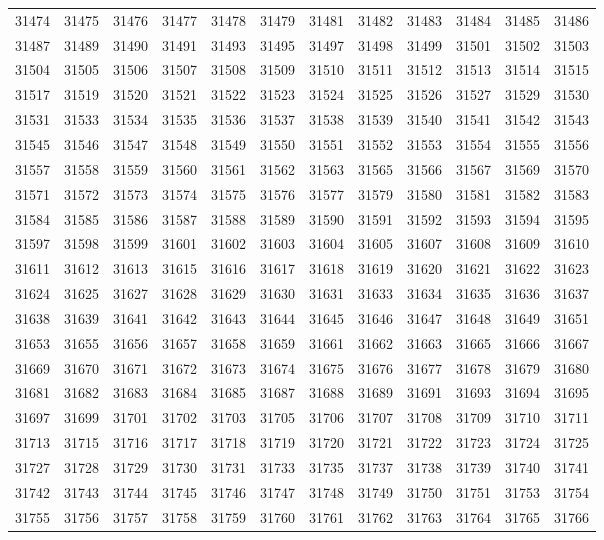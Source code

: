 \begin{center}
\begin{longtable}{llllllllllll}
31474 &31475 &31476 &31477 &31478 &31479 &31481 &31482 &31483 &31484 &31485 &31486 \\
31487 &31489 &31490 &31491 &31493 &31495 &31497 &31498 &31499 &31501 &31502 &31503 \\
31504 &31505 &31506 &31507 &31508 &31509 &31510 &31511 &31512 &31513 &31514 &31515 \\
31517 &31519 &31520 &31521 &31522 &31523 &31524 &31525 &31526 &31527 &31529 &31530 \\
31531 &31533 &31534 &31535 &31536 &31537 &31538 &31539 &31540 &31541 &31542 &31543 \\
31545 &31546 &31547 &31548 &31549 &31550 &31551 &31552 &31553 &31554 &31555 &31556 \\
31557 &31558 &31559 &31560 &31561 &31562 &31563 &31565 &31566 &31567 &31569 &31570 \\
31571 &31572 &31573 &31574 &31575 &31576 &31577 &31579 &31580 &31581 &31582 &31583 \\
31584 &31585 &31586 &31587 &31588 &31589 &31590 &31591 &31592 &31593 &31594 &31595 \\
31597 &31598 &31599 &31601 &31602 &31603 &31604 &31605 &31607 &31608 &31609 &31610 \\
31611 &31612 &31613 &31615 &31616 &31617 &31618 &31619 &31620 &31621 &31622 &31623 \\
31624 &31625 &31627 &31628 &31629 &31630 &31631 &31633 &31634 &31635 &31636 &31637 \\
31638 &31639 &31641 &31642 &31643 &31644 &31645 &31646 &31647 &31648 &31649 &31651 \\
31653 &31655 &31656 &31657 &31658 &31659 &31661 &31662 &31663 &31665 &31666 &31667 \\
31669 &31670 &31671 &31672 &31673 &31674 &31675 &31676 &31677 &31678 &31679 &31680 \\
31681 &31682 &31683 &31684 &31685 &31687 &31688 &31689 &31691 &31693 &31694 &31695 \\
31697 &31699 &31701 &31702 &31703 &31705 &31706 &31707 &31708 &31709 &31710 &31711 \\
31713 &31715 &31716 &31717 &31718 &31719 &31720 &31721 &31722 &31723 &31724 &31725 \\
31727 &31728 &31729 &31730 &31731 &31733 &31735 &31737 &31738 &31739 &31740 &31741 \\
31742 &31743 &31744 &31745 &31746 &31747 &31748 &31749 &31750 &31751 &31753 &31754 \\
31755 &31756 &31757 &31758 &31759 &31760 &31761 &31762 &31763 &31764 &31765 &31766 \\

\end{longtable}
\end{center}
